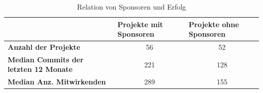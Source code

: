 \begin{table}[h]
    \begin{tabular}{l|c|c|}
        \cline{2-3}
                                                      & \multicolumn{1}{l|}{\textbf{Projekte mit Sponsoren}} & \multicolumn{1}{l|}{\textbf{Projekte ohne Sponsoren}} \\ \hline
        \textbf{Anzahl der Projekte}                  & 56                                                   & 52                                                    \\ \hline
        \textbf{Median Commits der letzten 12 Monate} & 221                                                  & 128                                                   \\ \hline
        \textbf{Median Anz. Mitwirkenden}             & 289                                                  & 155                                                   \\ \hline
    \end{tabular}%
    \caption{Relation von Sponsoren und Erfolg}
    \label{tab:Sponsors_vs_NonSponsors}
\end{table}

